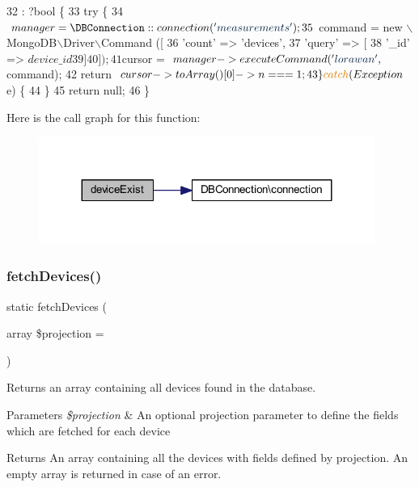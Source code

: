 \begin{DoxyCode}
32                                                            : ?\textcolor{keywordtype}{bool} \{
33         \textcolor{keywordflow}{try} \{
34             $manager = \DBConnection::connection (\textcolor{stringliteral}{'measurements'});
35             $command = new \(\backslash\)MongoDB\(\backslash\)Driver\(\backslash\)Command ([
36                 \textcolor{stringliteral}{'count'} => \textcolor{stringliteral}{'devices'},
37                 \textcolor{stringliteral}{'query'} => [
38                     \textcolor{stringliteral}{'\_id'} => $device\_id
39                 ]
40             ]);
41             $cursor = $manager->executeCommand (\textcolor{stringliteral}{'lorawan'}, $command);
42             \textcolor{keywordflow}{return} $cursor->toArray ()[0]->n === 1;
43         \} \textcolor{keywordflow}{catch} (Exception $e) \{
44         \}
45         \textcolor{keywordflow}{return} null;
46     \}
\end{DoxyCode}
Here is the call graph for this function\+:
\nopagebreak
\begin{figure}[H]
\begin{center}
\leavevmode
\includegraphics[width=311pt]{class_lora_1_1_d_a_o_aad2161af4b52afb99e2a931538559823_cgraph}
\end{center}
\end{figure}
\mbox{\label{class_lora_1_1_d_a_o_a223eeb00734ccb30b2a83b7557b4dbf1}} 
\subsubsection{fetch\+Devices()}
{\footnotesize\ttfamily static fetch\+Devices (\begin{DoxyParamCaption}\item[{array}]{\$projection = {\ttfamily []} }\end{DoxyParamCaption})\hspace{0.3cm}{\ttfamily [static]}}

Returns an array containing all devices found in the database. 
\begin{DoxyParams}{Parameters}
{\em \$projection} & An optional projection parameter to define the fields which are fetched for each device \\
\hline
\end{DoxyParams}
\begin{DoxyReturn}{Returns}
An array containing all the devices with fields defined by projection. An empty array is returned in case of an error. 
\end{DoxyReturn}

